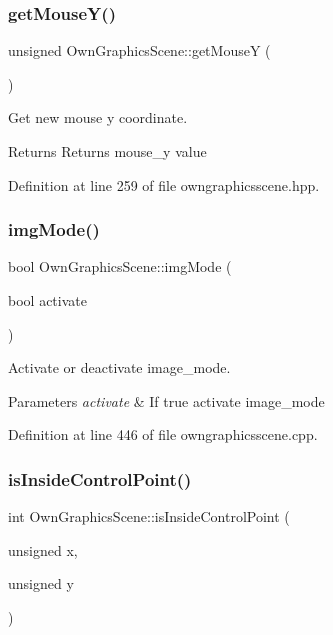 \subsubsection{\texorpdfstring{get\+Mouse\+Y()}{getMouseY()}}
{\footnotesize\ttfamily unsigned Own\+Graphics\+Scene\+::get\+MouseY (\begin{DoxyParamCaption}{ }\end{DoxyParamCaption})\hspace{0.3cm}{\ttfamily [inline]}}



Get new mouse y coordinate. 

\begin{DoxyReturn}{Returns}
Returns mouse\+\_\+y value 
\end{DoxyReturn}


Definition at line 259 of file owngraphicsscene.\+hpp.

\mbox{\label{classOwnGraphicsScene_acc6e7978a3f10889e439ceabd155a341}} 
\subsubsection{\texorpdfstring{img\+Mode()}{imgMode()}}
{\footnotesize\ttfamily bool Own\+Graphics\+Scene\+::img\+Mode (\begin{DoxyParamCaption}\item[{bool}]{activate }\end{DoxyParamCaption})}



Activate or deactivate image\+\_\+mode. 


\begin{DoxyParams}{Parameters}
{\em activate} & If true activate image\+\_\+mode \\
\hline
\end{DoxyParams}


Definition at line 446 of file owngraphicsscene.\+cpp.

\mbox{\label{classOwnGraphicsScene_ab8e0992d026eaeeda434d659c9c18a46}} 
\subsubsection{\texorpdfstring{is\+Inside\+Control\+Point()}{isInsideControlPoint()}}
{\footnotesize\ttfamily int Own\+Graphics\+Scene\+::is\+Inside\+Control\+Point (\begin{DoxyParamCaption}\item[{unsigned}]{x,  }\item[{unsigned}]{y }\end{DoxyParamCaption})}



